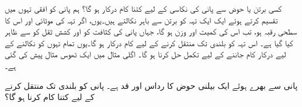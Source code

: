 کسی برتن یا حوض سے پانی کی نکاسی کے لیے  کتنا کام درکار ہو گا؟ ہم پانی کو افقی تہوں میں تقسیم کرتے ہوئے ایک ایک تہہ کو برتن سے باہر نکالتے ہیں۔یوں، اگر تہہ کی موٹائی  اور اس کا  سطحی رقبہ  ہو، تب اس کی کمیت  اور وزن  ہو گا،  جہاں پانی کی کثافت کو  اور کشش ثقل کو  سے ظاہر کیا گیا ہے۔ اس تہہ کو بلندی  تک منتقل کرنے کے لیے   کام  درکار  ہو گا۔یوں تمام تہوں کو نکالنے کے لیے درکار کام  جاننے کے لیے  تکمل حل کرنا ہو گا۔  اگلی  مثال میں ایک ٹھوس مثال پیش کی گئی ہے۔

پانی سے بھرے ہوئے ایک بیلنی حوض کا رداس  اور قد  ہے۔ پانی کو  بلندی تک منتقل کرنے کے  لیے  کتنا کام کرنا ہو گا؟

